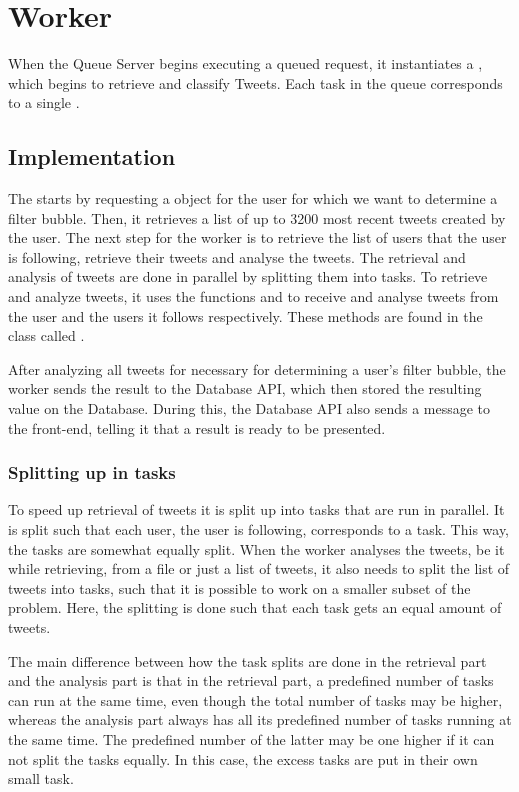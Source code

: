\chapter{Worker}\label{workerLabel}
When the Queue Server begins executing a queued request, it instantiates a
, which begins to retrieve and classify Tweets. Each task in the
queue corresponds to a single .

\section{Implementation}
The  starts by requesting a  object for the user for
which we want to determine a filter bubble. Then, it retrieves a list of up to
3200 most recent tweets created by the user. The next step for the worker is to
retrieve the list of users that the user is following, retrieve their tweets and
analyse the tweets. The retrieval and analysis of tweets are done in parallel by
splitting them into tasks. To retrieve and analyze tweets, it uses the functions
 and 
to receive and analyse tweets from the user and the users it follows
respectively. These methods are found in the class called
.\nl

After analyzing all tweets for necessary for determining a user's filter bubble,
the worker sends the result to the Database \ac{API}, which then stored the
resulting value on the Database. During this, the Database \ac{API} also sends a
message to the front-end, telling it that a result is ready to be presented.

\subsection{Splitting up in tasks}\label{sec:taskSplit}
To speed up retrieval of tweets it is split up into tasks that are
run in parallel. It is split such that each user, the user is following,
corresponds to a task. This way, the tasks are somewhat equally split.
When the worker analyses the tweets, be it while retrieving, from a file or just
a list of tweets, it also needs to split the list of tweets into tasks, such
that it is possible to work on a smaller subset of the problem. Here, the
splitting is done such that each task gets an equal amount of tweets.

The main difference between how the task splits are done in the retrieval
part and the analysis part is that in the retrieval part, a predefined number
of tasks can run at the same time, even though the total number of tasks may be
higher, whereas the analysis part always has all its predefined number of tasks
running at the same time. The predefined number of the latter may be one higher
if it can not split the tasks equally. In this case, the excess tasks are put in
their own small task.


